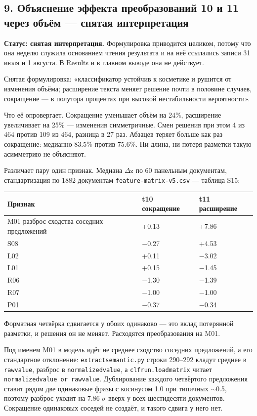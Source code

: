 \documentclass[11pt,a4paper]{article}
\renewcommand{\_}{\textunderscore\allowbreak}
\begin{document}
\subsection{9. Объяснение эффекта преобразований 10 и 11 через объём — снятая интерпретация}

\textbf{Статус: снятая интерпретация.} Формулировка приводится целиком, потому что она
неделю служила основанием чтения результата и на неё ссылались записи 31 июля и
1 августа. В Results и в главном выводе она не действует.

Снятая формулировка: «классификатор устойчив к косметике и рушится от изменения
объёма; расширение текста меняет решение почти в половине случаев, сокращение —
в полутора процентах при высокой нестабильности вероятности».

Что её опровергает. Сокращение уменьшает объём на 24\%, расширение увеличивает на
25\% — изменения симметричные. Смен решения при этом 4 из 464 против 109 из 464,
разница в 27 раз. Абзацев теряет больше как раз сокращение: медианно 83.5\%
против 75.6\%. Ни длина, ни потеря разметки такую асимметрию не объясняют.

Различает пару один признак. Медиана $\Delta$z по 60 панельным документам,
стандартизация по 1882 документам \texttt{feature-\allowbreak{}matrix-\allowbreak{}v5.csv} — таблица S15:

\begin{center}
\small
\begin{tabular}{lll}
\toprule
Признак & t10 сокращение & t11 расширение \\
\midrule
M01 разброс сходства соседних предложений & +0.13 & +7.86 \\
S08 & $-$0.27 & +4.53 \\
L02 & +0.11 & $-$3.02 \\
L01 & +0.15 & $-$1.45 \\
R06 & $-$1.30 & $-$1.39 \\
R07 & $-$1.00 & $-$1.00 \\
P01 & $-$0.37 & $-$0.34 \\
\bottomrule
\end{tabular}
\end{center}

Форматная четвёрка сдвигается у обоих одинаково — это вклад потерянной разметки,
и решения он не меняет. Расходятся преобразования на M01.

Под именем M01 в модель идёт не среднее сходство соседних предложений, а его
стандартное отклонение: \texttt{extract\_semantic.py} строки 290–292 кладут среднее в
\texttt{raw\_value}, разброс в \texttt{normalized\_value}, а \texttt{clf\_run.load\_matrix} читает
\texttt{normalized\_value or raw\_value}. Дублирование каждого четвёртого предложения
ставит рядом две одинаковые фразы с косинусом 1.0 при типичных $\sim$0.5, поэтому
разброс уходит на 7.86 $\sigma$ вверх у всех шестидесяти документов. Сокращение
одинаковых соседей не создаёт, и такого сдвига у него нет.
\end{document}
